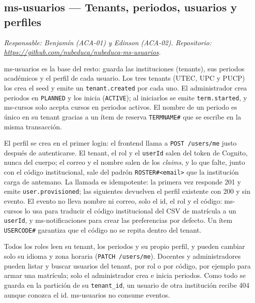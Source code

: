 \subsection{ms-usuarios --- Tenants, periodos, usuarios y perfiles}
\label{sec:ms-usuarios}
\textit{Responsable: Benjamín (ACA-01) y Edinson (ACA-02). Repositorio: \url{https://github.com/nubeduca/nubeduca-ms-usuarios}.}

ms-usuarios es la base del resto: guarda las instituciones (tenants), sus periodos académicos y el perfil de cada usuario. Los tres tenants (UTEC, UPC y PUCP) los crea el seed y emite un \texttt{tenant.created} por cada uno. El administrador crea periodos en \texttt{PLANNED} y los inicia (\texttt{ACTIVE}); al iniciarlos se emite \texttt{term.started}, y ms-cursos solo acepta cursos en periodos activos. El nombre de un periodo es único en su tenant gracias a un ítem de reserva \texttt{TERMNAME\#} que se escribe en la misma transacción.

El perfil se crea en el primer login: el frontend llama a \texttt{POST /users/me} justo después de autenticarse. El tenant, el rol y el \texttt{userId} salen del token de Cognito, nunca del cuerpo; el correo y el nombre salen de los \textit{claims}, y lo que falte, junto con el código institucional, sale del padrón \texttt{ROSTER\#<email>} que la institución carga de antemano. La llamada es idempotente: la primera vez responde 201 y emite \texttt{user.provisioned}; las siguientes devuelven el perfil existente con 200 y sin evento. El evento no lleva nombre ni correo, solo el id, el rol y el código: ms-cursos lo usa para traducir el código institucional del CSV de matrícula a un \texttt{userId}, y ms-notificaciones para crear las preferencias por defecto. Un ítem \texttt{USERCODE\#} garantiza que el código no se repita dentro del tenant.

Todos los roles leen su tenant, los periodos y su propio perfil, y pueden cambiar solo su idioma y zona horaria (\texttt{PATCH /users/me}). Docentes y administradores pueden listar y buscar usuarios del tenant, por rol o por código, por ejemplo para armar una matrícula; solo el administrador crea e inicia periodos. Como todo se guarda en la partición de su \texttt{tenant\_id}, un usuario de otra institución recibe 404 aunque conozca el id. ms-usuarios no consume eventos.

